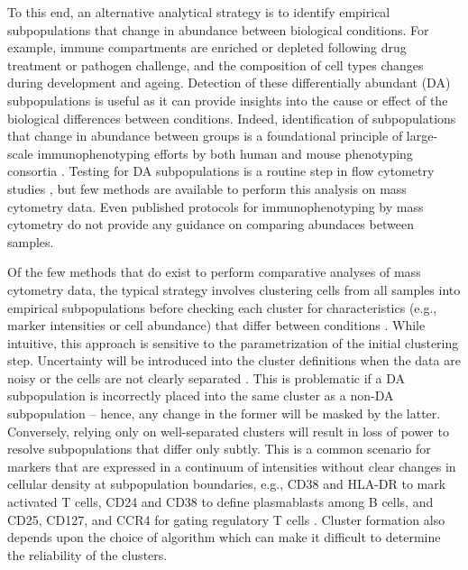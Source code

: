 \documentclass{article}
\begin{document}
To this end, an alternative analytical strategy is to identify empirical subpopulations that change in abundance between biological conditions.
For example, immune compartments are enriched or depleted following drug treatment or pathogen challenge, and the composition of cell types changes during development and ageing.
Detection of these differentially abundant (DA) subpopulations is useful as it can provide insights into the cause or effect of the biological differences between conditions.
Indeed, identification of subpopulations that change in abundance between groups is a foundational principle of large-scale immunophenotyping efforts by both human and mouse phenotyping consortia \cite{maecker2012standardizing,brown2012international,finak2016standardizing}.
Testing for DA subpopulations is a routine step in flow cytometry studies \cite{saeys2016computational,mittag2011recent}, but few methods are available to perform this analysis on mass cytometry data.
Even published protocols for immunophenotyping by mass cytometry \cite{leipold2015multiparameter,leelatian2015characterizing} do not provide any guidance on comparing abundaces between samples.

Of the few methods that do exist to perform comparative analyses of mass cytometry data, the typical strategy involves clustering cells from all samples into empirical subpopulations before checking each cluster for characteristics (e.g., marker intensities or cell abundance) that differ between conditions \cite{anchang2016visualization,bruggner2014automated}.
While intuitive, this approach is sensitive to the parametrization of the initial clustering step.
Uncertainty will be introduced into the cluster definitions when the data are noisy or the cells are not clearly separated \cite{suzuki2006pvclust,kerr2001bootstrapping}.
This is problematic if a DA subpopulation is incorrectly placed into the same cluster as a non-DA subpopulation -- hence, any change in the former will be masked by the latter.
Conversely, relying only on well-separated clusters will result in loss of power to resolve subpopulations that differ only subtly.
This is a common scenario for markers that are expressed in a continuum of intensities without clear changes in cellular density at subpopulation boundaries, e.g., CD38 and HLA-DR to mark activated T cells, CD24 and CD38 to define plasmablasts among B cells, and CD25, CD127, and CCR4 for gating regulatory T cells \cite{finak2016standardizing}.
Cluster formation also depends upon the choice of algorithm \cite{datta2003comparisons,wiwie2015comparing} which can make it difficult to determine the reliability of the clusters.
\end{document}
